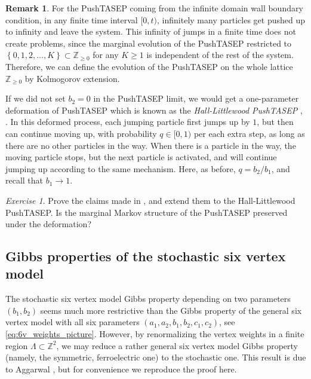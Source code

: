 \documentclass[letterpaper,11pt,oneside,reqno]{article}
\numberwithin{equation}{section}
\theoremstyle{definition}
\newtheorem{remark}[proposition]{Remark}
\theoremstyle{remark}
\newtheorem{exercise}{Exercise}[section]
\begin{document}
\begin{remark}
	\label{rmk:PushTASEP_inf_jumps}
	For the PushTASEP coming from the infinite domain wall boundary condition, in any finite
	time interval $[0,t)$, infinitely many particles get pushed up to infinity and leave the system. 
	This infinity of jumps in a finite time does not create problems, since 
	the marginal evolution of the PushTASEP restricted to $\left\{ 0,1,2,\ldots,K  \right\}\subset\mathbb{Z}_{\ge0}$
	for any $K\ge1$ is independent of the rest of the system. Therefore, we can define the 
	evolution of the PushTASEP on the whole lattice $\mathbb{Z}_{\ge0}$
	by Kolmogorov extension.
\end{remark}

If we did not set $b_2=0$ in the PushTASEP limit, 
we would get a one-parameter deformation of PushTASEP
which is known as the \emph{Hall-Littlewood PushTASEP}
\cite{BorodinBufetovWheeler2016},
\cite{Ghosal2017KPZ}.
In this deformed process, each jumping particle first jumps up by $1$, but then can 
continue moving up, with probability $q\in[0,1)$ per each extra step,
as long as there are no other particles in the way. When 
there is a particle in the way, the moving particle 
stops, but the next particle is activated, and will continue 
jumping up according to the same mechanism.
Here, as before, $q=b_2/b_1$, and recall that $b_1\to1$.

\begin{exercise}
	Prove the claims made in , and 
	extend them to the Hall-Littlewood PushTASEP. Is the marginal Markov
	structure of the PushTASEP preserved under the deformation?
\end{exercise}


\subsection{Gibbs properties of the stochastic six vertex model}
\label{sub:Gibbs_s6v}

The stochastic six vertex model Gibbs property
depending on two parameters $(b_1,b_2)$
seems much more restrictive than the 
Gibbs property of the general six vertex model
with all six parameters
$(a_1,a_2,b_1,b_2,c_1,c_2)$, 
see \eqref{eq:6v_weights_picture}.
However, by renormalizing the vertex weights
in a finite region $\Lambda\subset\mathbb{Z}^{2}$,
we may reduce a rather general six vertex model Gibbs property 
(namely, the symmetric, ferroelectric one)
to the 
stochastic one.
This result is due to Aggarwal \cite[Appendix A.1]{Amol2016Stationary},
but for convenience we reproduce the proof here.
\end{document}
